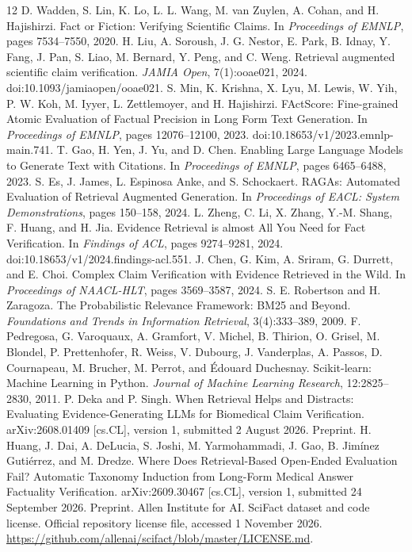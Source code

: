 \begin{thebibliography}{12}
 D. Wadden, S. Lin, K. Lo, L. L. Wang, M. van Zuylen, A. Cohan, and H. Hajishirzi. Fact or Fiction: Verifying Scientific Claims. In \emph{Proceedings of EMNLP}, pages 7534--7550, 2020.
 H. Liu, A. Soroush, J. G. Nestor, E. Park, B. Idnay, Y. Fang, J. Pan, S. Liao, M. Bernard, Y. Peng, and C. Weng. Retrieval augmented scientific claim verification. \emph{JAMIA Open}, 7(1):ooae021, 2024. doi:10.1093/jamiaopen/ooae021.
 S. Min, K. Krishna, X. Lyu, M. Lewis, W. Yih, P. W. Koh, M. Iyyer, L. Zettlemoyer, and H. Hajishirzi. FActScore: Fine-grained Atomic Evaluation of Factual Precision in Long Form Text Generation. In \emph{Proceedings of EMNLP}, pages 12076--12100, 2023. doi:10.18653/v1/2023.emnlp-main.741.
 T. Gao, H. Yen, J. Yu, and D. Chen. Enabling Large Language Models to Generate Text with Citations. In \emph{Proceedings of EMNLP}, pages 6465--6488, 2023.
 S. Es, J. James, L. Espinosa Anke, and S. Schockaert. RAGAs: Automated Evaluation of Retrieval Augmented Generation. In \emph{Proceedings of EACL: System Demonstrations}, pages 150--158, 2024.
 L. Zheng, C. Li, X. Zhang, Y.-M. Shang, F. Huang, and H. Jia. Evidence Retrieval is almost All You Need for Fact Verification. In \emph{Findings of ACL}, pages 9274--9281, 2024. doi:10.18653/v1/2024.findings-acl.551.
 J. Chen, G. Kim, A. Sriram, G. Durrett, and E. Choi. Complex Claim Verification with Evidence Retrieved in the Wild. In \emph{Proceedings of NAACL-HLT}, pages 3569--3587, 2024.
 S. E. Robertson and H. Zaragoza. The Probabilistic Relevance Framework: BM25 and Beyond. \emph{Foundations and Trends in Information Retrieval}, 3(4):333--389, 2009.
 F. Pedregosa, G. Varoquaux, A. Gramfort, V. Michel, B. Thirion, O. Grisel, M. Blondel, P. Prettenhofer, R. Weiss, V. Dubourg, J. Vanderplas, A. Passos, D. Cournapeau, M. Brucher, M. Perrot, and {\'E}douard Duchesnay. Scikit-learn: Machine Learning in Python. \emph{Journal of Machine Learning Research}, 12:2825--2830, 2011.
 P. Deka and P. Singh. When Retrieval Helps and Distracts: Evaluating Evidence-Generating LLMs for Biomedical Claim Verification. arXiv:2608.01409 [cs.CL], version 1, submitted 2 August 2026. Preprint.
 H. Huang, J. Dai, A. DeLucia, S. Joshi, M. Yarmohammadi, J. Gao, B. Jim{\'i}nez Guti{\'e}rrez, and M. Dredze. Where Does Retrieval-Based Open-Ended Evaluation Fail? Automatic Taxonomy Induction from Long-Form Medical Answer Factuality Verification. arXiv:2609.30467 [cs.CL], version 1, submitted 24 September 2026. Preprint.
 Allen Institute for AI. SciFact dataset and code license. Official repository license file, accessed 1 November 2026. \url{https://github.com/allenai/scifact/blob/master/LICENSE.md}.
\end{thebibliography}
